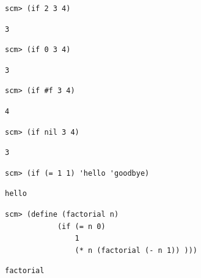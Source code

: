 \documentclass{exam}
\begin{document}
\begin{questions}
\begin{blocksection}
\begin{lstlisting}
scm> (if 2 3 4)
\end{lstlisting}
\begin{solution}[.25in]
\begin{lstlisting}
3
\end{lstlisting}
\end{solution}

\begin{lstlisting}
scm> (if 0 3 4)
\end{lstlisting}
\begin{solution}[.25in]
\begin{lstlisting}
3
\end{lstlisting}
\end{solution}

\begin{lstlisting}
scm> (if #f 3 4)
\end{lstlisting}
\begin{solution}[.25in]
\begin{lstlisting}
4
\end{lstlisting}
\end{solution}

\begin{lstlisting}
scm> (if nil 3 4)
\end{lstlisting}
\begin{solution}[.25in]
\begin{lstlisting}
3
\end{lstlisting}
\end{solution}

\begin{lstlisting}
scm> (if (= 1 1) 'hello 'goodbye)
\end{lstlisting}
\begin{solution}[.25in]
\begin{lstlisting}
hello
\end{lstlisting}
\end{solution}

\begin{lstlisting}
scm> (define (factorial n)
            (if (= n 0)
                1
                (* n (factorial (- n 1)) )))
\end{lstlisting}
\begin{solution}[.25in]
\begin{lstlisting}
factorial
\end{lstlisting}
\end{solution}


\end{blocksection}
\end{questions}
\end{document}
